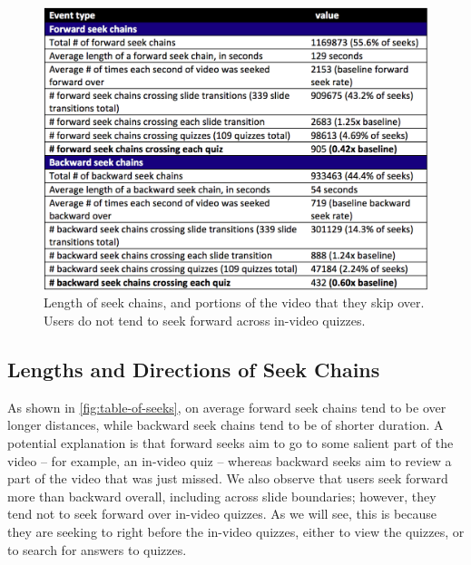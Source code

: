 \documentclass{sigchi}
\begin{document}



\begin{figure}
\includegraphics[width=1.0\columnwidth]{table-of-seeks}
\caption{Length of seek chains, and portions of the video that they skip over. Users do not tend to seek forward across in-video quizzes.}
\label{fig:table-of-seeks}
\end{figure}

\pagebreak

\subsection{Lengths and Directions of Seek Chains}

As shown in \autoref{fig:table-of-seeks}, on average forward seek chains tend to be over longer distances, while backward seek chains tend to be of shorter duration. A potential explanation is that forward seeks aim to go to some salient part of the video -- for example, an in-video quiz -- whereas backward seeks aim to review a part of the video that was just missed. We also observe that users seek forward more than backward overall, including across slide boundaries; however, they tend not to seek forward over in-video quizzes. As we will see, this is because they are seeking to right before the in-video quizzes, either to view the quizzes, or to search for answers to quizzes. %
\end{document}
